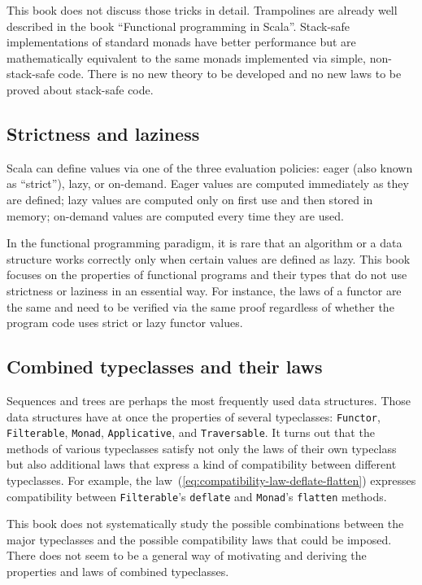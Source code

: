 This book does not discuss those tricks in detail. Trampolines are
already well described in the book \textsf{``}Functional programming in Scala\textsf{''}.
Stack-safe implementations of standard monads have better performance
but are mathematically equivalent to the same monads implemented via
simple, non-stack-safe code. There is no new theory to be developed
and no new laws to be proved about stack-safe code.

\subsection{Strictness and laziness}

Scala can define values via one of the three evaluation policies:
eager (also known as \textsf{``}strict\textsf{''}), lazy, or on-demand. Eager values
are computed immediately as they are defined; lazy values are computed
only on first use and then stored in memory; on-demand values are
computed every time they are used. 

In the functional programming paradigm, it is rare that an algorithm
or a data structure works correctly only when certain values are defined
as lazy. This book focuses on the properties of functional programs
and their types that do not use strictness or laziness in an essential
way. For instance, the laws of a functor are the same and need to
be verified via the same proof regardless of whether the program code
uses strict or lazy functor values. 

\subsection{Combined typeclasses and their laws}

Sequences and trees are perhaps the most frequently used data structures.
Those data structures have at once the properties of several typeclasses:
\lstinline!Functor!, \lstinline!Filterable!, \lstinline!Monad!,
\lstinline!Applicative!, and \lstinline!Traversable!. It turns out
that the methods of various typeclasses satisfy not only the laws
of their own typeclass but also additional laws that express a kind
of compatibility between different typeclasses. For example, the law~(\ref{eq:compatibility-law-deflate-flatten})
expresses compatibility between \lstinline!Filterable!\textsf{'}s \lstinline!deflate!
and \lstinline!Monad!\textsf{'}s \lstinline!flatten! methods.

This book does not systematically study the possible combinations
between the major typeclasses and the possible compatibility laws
that could be imposed. There does not seem to be a general way of
motivating and deriving the properties and laws of combined typeclasses.

